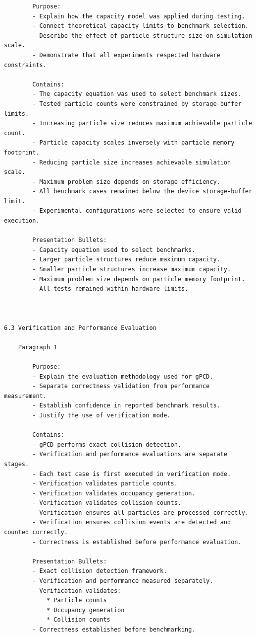 \begin{verbatim}
		Purpose:
		- Explain how the capacity model was applied during testing.
		- Connect theoretical capacity limits to benchmark selection.
		- Describe the effect of particle-structure size on simulation scale.
		- Demonstrate that all experiments respected hardware constraints.

		Contains:
		- The capacity equation was used to select benchmark sizes.
		- Tested particle counts were constrained by storage-buffer limits.
		- Increasing particle size reduces maximum achievable particle count.
		- Particle capacity scales inversely with particle memory footprint.
		- Reducing particle size increases achievable simulation scale.
		- Maximum problem size depends on storage efficiency.
		- All benchmark cases remained below the device storage-buffer limit.
		- Experimental configurations were selected to ensure valid execution.

		Presentation Bullets:
		- Capacity equation used to select benchmarks.
		- Larger particle structures reduce maximum capacity.
		- Smaller particle structures increase maximum capacity.
		- Maximum problem size depends on particle memory footprint.
		- All tests remained within hardware limits.



6.3 Verification and Performance Evaluation

	Paragraph 1

		Purpose:
		- Explain the evaluation methodology used for gPCD.
		- Separate correctness validation from performance measurement.
		- Establish confidence in reported benchmark results.
		- Justify the use of verification mode.

		Contains:
		- gPCD performs exact collision detection.
		- Verification and performance evaluations are separate stages.
		- Each test case is first executed in verification mode.
		- Verification validates particle counts.
		- Verification validates occupancy generation.
		- Verification validates collision counts.
		- Verification ensures all particles are processed correctly.
		- Verification ensures collision events are detected and counted correctly.
		- Correctness is established before performance evaluation.

		Presentation Bullets:
		- Exact collision detection framework.
		- Verification and performance measured separately.
		- Verification validates:
			* Particle counts
			* Occupancy generation
			* Collision counts
		- Correctness established before benchmarking.




\end{verbatim}
